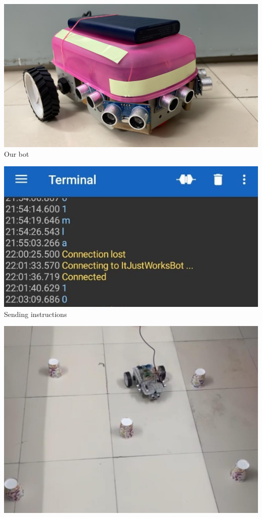 \documentclass{article}
\begin{document}
\begin{center}

\begin{minipage}{0.3\textwidth}
    \centering
    \includegraphics[width=\linewidth]{bot.jpeg}
    Our bot
\end{minipage}
\hfill
\begin{minipage}{0.3\textwidth}
    \centering
    \includegraphics[width=\linewidth]{bluetooth-phone.jpeg}
    Sending instructions
\end{minipage}
\hfill
\begin{minipage}{0.3\textwidth}
    \centering
    \includegraphics[width=\linewidth]{bot-moving.jpeg}

\end{minipage}
\end{center}
\end{document}
